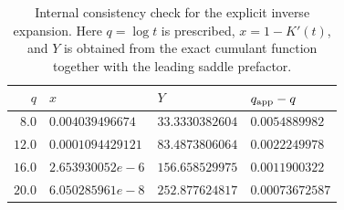 \begin{table}[tbp]
\centering
\caption{Internal consistency check for the explicit inverse expansion. Here $q=\log t$ is prescribed, $x=1-K'(t)$, and $Y$ is obtained from the exact cumulant function together with the leading saddle prefactor.}
\label{tab:inverse-check}
\begin{tabular}{@{}rlll@{}}
\toprule
$q$ & $x$ & $Y$ & $q_{\rm app}-q$ \\
\midrule
$8.0$ & $0.004039496674$ & $33.3330382604$ & $0.0054889982$ \\
$12.0$ & $0.0001094429121$ & $83.4873806064$ & $0.0022249978$ \\
$16.0$ & $2.653930052e-6$ & $156.658529975$ & $0.0011900322$ \\
$20.0$ & $6.050285961e-8$ & $252.877624817$ & $0.00073672587$ \\
\bottomrule
\end{tabular}
\end{table}
